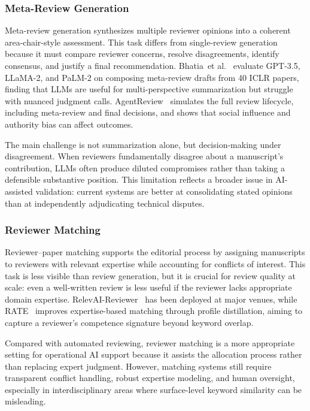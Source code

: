 \documentclass{llmxive}
\providecommand{\etal}{et al.\xspace}
\begin{document}
\subsubsection{Meta-Review Generation}
\label{sec:metareview}

Meta-review generation synthesizes multiple reviewer opinions into a coherent area-chair-style assessment. This task differs from single-review generation because it must compare reviewer concerns, resolve disagreements, identify consensus, and justify a final recommendation. Bhatia~\etal~\cite{metareviewllm2024} evaluate GPT-3.5, LLaMA-2, and PaLM-2 on composing meta-review drafts from 40 ICLR papers, finding that LLMs are useful for multi-perspective summarization but struggle with nuanced judgment calls. AgentReview~\cite{agentreview2024} simulates the full review lifecycle, including meta-review and final decisions, and shows that social influence and authority bias can affect outcomes.

The main challenge is not summarization alone, but decision-making under disagreement. When reviewers fundamentally disagree about a manuscript's contribution, LLMs often produce diluted compromises rather than taking a defensible substantive position. This limitation reflects a broader issue in AI-assisted validation: current systems are better at consolidating stated opinions than at independently adjudicating technical disputes.



\subsubsection{Reviewer Matching}
\label{sec:reviewer_matching}

Reviewer--paper matching supports the editorial process by assigning manuscripts to reviewers with relevant expertise while accounting for conflicts of interest. This task is less visible than review generation, but it is crucial for review quality at scale: even a well-written review is less useful if the reviewer lacks appropriate domain expertise. RelevAI-Reviewer~\cite{relevaireviewer2024} has been deployed at major venues, while RATE~\cite{rate2026} improves expertise-based matching through profile distillation, aiming to capture a reviewer's competence signature beyond keyword overlap.

Compared with automated reviewing, reviewer matching is a more appropriate setting for operational AI support because it assists the allocation process rather than replacing expert judgment. However, matching systems still require transparent conflict handling, robust expertise modeling, and human oversight, especially in interdisciplinary areas where surface-level keyword similarity can be misleading.
\end{document}
